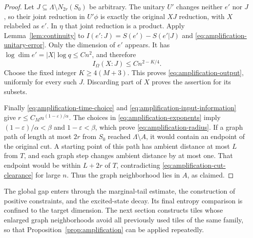 \begin{proof}
Let $J\subseteq\Lambda\setminus N_{2r}(S_0)$ be arbitrary.
The unitary $U'$ changes neither $e'$ nor $J$, so their joint
reduction in $U'\phi$ is exactly the original $XJ$ reduction,
with $X$ relabeled as $e'$.  In $\eta$ that joint reduction is a
product.  Apply Lemma~\ref{lem:continuity} to
$I(e':J)=S(e')-S(e'|J)$ and
\eqref{eq:amplification-unitary-error}.  Only the dimension of
$e'$ appears.  It has
$\log\dim e'=|X|\log q\le Cn^2$, and therefore
\[
 I_\Omega(X:J)\le Cn^{2-K/4}.
\]
Choose the fixed integer $K\ge4(M+3)$.
This proves \eqref{eq:amplification-output}, uniformly for every
such $J$.  Discarding part of $X$ proves the assertion for its subsets.

Finally \eqref{eq:amplification-time-choice} and
\eqref{eq:amplification-input-information} give
$r\le C_M n^{(1-\varepsilon)/\alpha}$.
The choices in \eqref{eq:amplification-exponents} imply
$(1-\varepsilon)/\alpha<\beta$ and $1-\varepsilon<\beta$,
which prove \eqref{eq:amplification-radius}.
If a graph path of length at most $2r$ from $S_0$ reached
$\Lambda\setminus A$, it would contain an endpoint of the original
cut.  A starting point of this path has ambient distance at most
$L$ from $T$, and each graph step changes ambient distance by at
most one.  That endpoint would be within $L+2r$ of $T$,
contradicting \eqref{eq:amplification-cut-clearance} for large $n$.
Thus the graph neighborhood lies in $A$, as claimed.
\end{proof}

The global gap enters through the marginal-tail estimate, the
construction of positive constraints, and the excited-state decay.
Its final entropy comparison is confined to the target dimension.
The next section constructs tiles whose enlarged graph neighborhoods
avoid all previously used tiles of the same family, so that
Proposition~\ref{prop:amplification} can be applied repeatedly.
